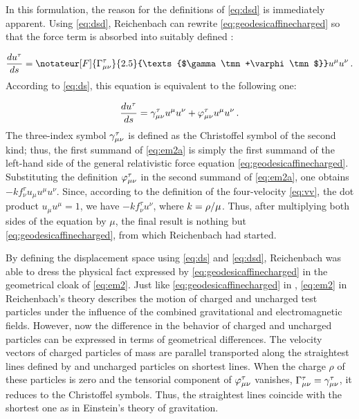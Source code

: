 \documentclass[final]{article}
\newcommand{\ctmrd}{\ensuremath{\hfrac{\rho}{\mu}}\xspace}
\begin{document}
In this formulation, the reason for the definitions of \cref{eq:dsd} is immediately apparent. Using \cref{eq:dsd}, Reichenbach can rewrite \eqref{eq:geodesicaffinecharged} so that the force term is absorbed into suitably defined \Gtmn:

\begin{equation}
\label{eq:em2} 
\frac{du^\tau}{ds} =\notateur[F]{\Gamma^{\tau}_{\mu\nu}}{2.5}{\texts{$\gamma\tmn+\varphi\tmn$}}u^\mu u^\nu\,.
\end{equation}
%
According to \cref{eq:ds}, this equation is equivalent to the following one:

\begin{equation}
\label{eq:em2a} 
\frac{du^\tau}{ds}=\gamma^{\tau}_{\mu\nu}u^\mu u^\nu+\varphi^{\tau}_{\mu\nu}u^\mu u^\nu\,.
\end{equation}
%
The three-index symbol $\gamma^\tau_{\mu\nu}$ is defined as the Christoffel symbol of the second kind; thus, the first summand of \cref{eq:em2a} is simply the first summand of the left-hand side of the general relativistic force equation \cref{eq:geodesicaffinecharged}. Substituting the definition $\varphi^\tau_{\mu\nu}$ in the second summand of \cref{eq:em2a}, one obtains $- k f_\nu^{\tau} u_\mu u^\mu u^\nu$. Since, according to the definition of the four-velocity \cref{eq:vv}, the dot product $u_\mu u^\mu=1$, we have $- k f_\nu^{\tau} u^\nu$, where $k=\ctmrd$. Thus, after multiplying both sides of the equation by $\mu$, the final result is nothing but \cref{eq:geodesicaffinecharged}, from which Reichenbach had started.

By defining the displacement space \Gtmn using \cref{eq:ds} and \cref{eq:dsd}, Reichenbach was able to dress the physical fact expressed by \cref{eq:geodesicaffinecharged} in the geometrical cloak of \cref{eq:em2}. Just like \cref{eq:geodesicaffinecharged} in \gr, \cref{eq:em2} in Reichenbach's theory describes the motion of charged and uncharged test particles under the influence of the combined gravitational and electromagnetic fields. However, now the difference in the behavior of charged and uncharged particles can be expressed in terms of geometrical differences. The velocity vectors of charged particles of mass are parallel transported along the straightest lines defined by \Gtmn and uncharged particles on shortest lines. When the charge $\rho$ of these particles is zero and the tensorial component of $\varphi^\tau_{\mu\nu}$ vanishes, $\Gamma^\tau_{\mu\nu}=\gamma^\tau_{\mu\nu}$, \ie it reduces to the Christoffel symbols. Thus, the straightest lines coincide with the shortest one as in Einstein's theory of gravitation.
\end{document}
